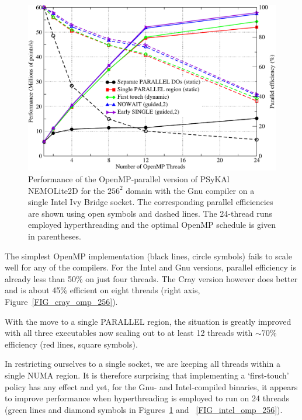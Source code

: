 \documentclass[gmdd, manuscript]{copernicus}
\newlength{\picwidth}
\begin{document}
\begin{figure}
\centering
\includegraphics[width=\picwidth]{omp_scaling_256_gnu}
\caption{Performance of the OpenMP-parallel version of
  {PS}y{KA}l NEMOLite2D for the $256^2$ domain with the Gnu compiler on
  a single Intel Ivy Bridge socket. The corresponding parallel
  efficiencies are shown using open symbols and dashed lines. The
  24-thread runs employed hyperthreading and the optimal OpenMP
  schedule is given in parentheses.}
\label{FIG_gnu_omp_256}
\end{figure}

The simplest OpenMP implementation (black lines, circle symbols) fails
to scale well for any of the compilers. For the Intel and Gnu
versions, parallel efficiency is already less than 50\% on just four
threads. The Cray version however does better and is about 45\%
efficient on eight threads (right axis, Figure~\ref{FIG_cray_omp_256}).

With the move to a single PARALLEL region, the situation
is greatly improved with all three executables now scaling out to at
least 12 threads with $\sim70$\% efficiency (red lines, square symbols).

In restricting ourselves to a single socket, we are keeping all
threads within a single NUMA region. It is therefore surprising that
implementing a `first-touch' policy has any effect and yet, for the
Gnu- and Intel-compiled binaries, it appears to improve performance
when hyperthreading is employed to run on 24 threads (green lines and
diamond symbols in Figures~\ref{FIG_gnu_omp_256} and
~\ref{FIG_intel_omp_256}).
\end{document}
